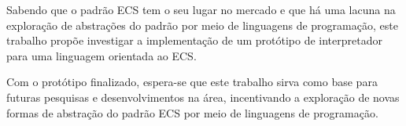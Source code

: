 Sabendo que o padrão ECS tem o seu lugar no mercado e que há uma lacuna na exploração de abstrações do padrão por meio de linguagens de programação, este trabalho propõe investigar a implementação de um protótipo de interpretador para uma linguagem orientada ao ECS.

Com o protótipo finalizado, espera-se que este trabalho sirva como base para futuras pesquisas e desenvolvimentos na área, incentivando a exploração de novas formas de abstração do padrão ECS por meio de linguagens de programação.
